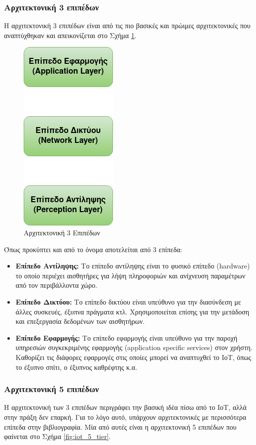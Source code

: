 \subsubsection{Αρχιτεκτονική 3 επιπέδων}
Η αρχιτεκτονική 3 επιπέδων είναι από τις πιο βασικές και πρώιμες αρχιτεκτονικές που αναπτύχθηκαν και απεικονίζεται στο Σχήμα \ref{fig:iot_3_tier}.
\begin{figure}[h]
    \centering
    \includegraphics[scale=0.7]{images/chapter2/IoT_3tier.png}
    \caption{Αρχιτεκτονική 3 Επιπέδων}
    \label{fig:iot_3_tier}
\end{figure}

Όπως προκύπτει και από το όνομα αποτελείται από 3 επίπεδα:
\begin{itemize}
    \item \textbf{Επίπεδο Αντίληψης:} Το επίπεδο αντίληψης είναι το φυσικό επίπεδο (hardware) το οποίο περιέχει αισθητήρες για λήψη πληροφοριών και ανίχνευση παραμέτρων από τον περιβάλλοντα χώρο.
    \item \textbf{Επίπεδο Δικτύου:} Το επίπεδο δικτύου είναι υπεύθυνο για την διασύνδεση με άλλες συσκευές, έξυπνα πράγματα κτλ. Χρησιμοποιείται επίσης για την μετάδοση και επεξεργασία δεδομένων των αισθητήρων.
    \item \textbf{Επίπεδο Εφαρμογής:} Το επίπεδο εφαρμογής είναι υπεύθυνο για την παροχή υπηρεσιών συγκεκριμένης εφαρμογής (application specific services) στον χρήστη. Καθορίζει τις διάφορες εφαρμογές στις οποίες μπορεί να αναπτυχθεί το ΙοΤ, όπως το έξυπνο σπίτι, ο έξυπνος καθρέφτης κ.α.
\end{itemize}

\subsubsection{Αρχιτεκτονική 5 επιπέδων}
Η αρχιτεκτονική των 3 επιπέδων περιγράφει την βασική ιδέα πίσω από το ΙοΤ, αλλά στην πράξη δεν επαρκή. Για το λόγο αυτό, υπάρχουν αρχιτεκτονικές με περισσότερα επίπεδα στην βιβλιογραφία. Μία από αυτές είναι η αρχιτεκτονική 5 επιπέδων που φαίνεται στο Σχήμα \ref{fig:iot_5_tier}.

